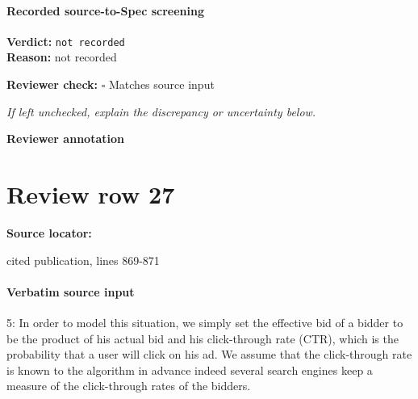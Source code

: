 \documentclass[10pt]{article}
\newcommand{\reviewerbox}{%
  \par\noindent\fbox{\parbox{0.96\linewidth}{\rule{0pt}{0.38in}}}\par
}
\newcommand{\reviewmatch}[1]{%
  \par\noindent\textbf{Reviewer check:} $\square$\; #1\par
  \noindent\emph{If left unchecked, explain the discrepancy or uncertainty below.}\par
}
\begin{document}
\paragraph{Recorded source-to-Spec screening}
\textbf{Verdict:} \texttt{not recorded}
\\
\textbf{Reason:} not recorded
\reviewmatch{Matches source input}
\noindent\textbf{Reviewer annotation}\par
\reviewerbox
\clearpage
\hypertarget{source-claim-ea5cc87f3aef8a1a}{}
\section*{Review row 27}
\textbf{Source locator:} {\footnotesize\raggedright cited publication, lines 869-\allowbreak{}871\par}
\paragraph{Verbatim source input}
\begin{ReviewVerbatim}
5: In order to model this situation, we simply set the effective bid of a bidder to be the product
of his actual bid and his click-through rate (CTR), which is the probability that a user will
click on his ad. We assume that the click-through rate is known to the algorithm in advance indeed several search engines keep a measure of the click-through rates of the bidders.
\end{ReviewVerbatim}
\end{document}
